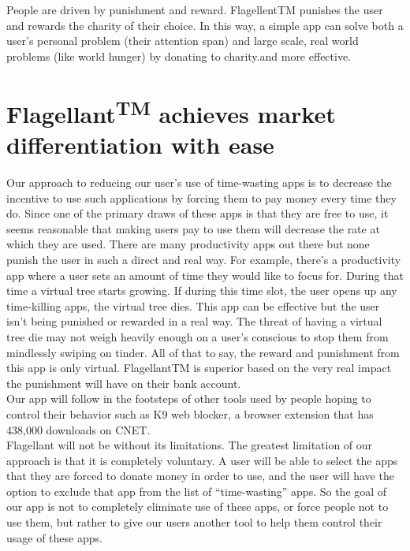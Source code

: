\documentclass[12pt]{article}
\begin{document}
People are driven by punishment and reward. FlagellentTM punishes the user and rewards the charity of their choice. In this way, a simple app can solve both a user’s personal problem (their attention span) and large scale, real world problems (like world hunger) by donating to charity.and more effective. \\

\section{ Flagellant\textsuperscript{TM} achieves market differentiation with ease}
Our approach to reducing our user’s use of time-wasting apps is to decrease the incentive to use such applications by forcing them to pay money every time they do. Since one of the primary draws of these apps is that they are free to use, it seems reasonable that making users pay to use them will decrease the rate at which they are used.
There are many productivity apps out there but none punish the user in such a direct and real way. For example, there’s a productivity app where a user sets an amount of time they would like to focus for. During that time a virtual tree starts growing. If during this time slot, the user opens up any time-killing apps, the virtual tree dies. This app can be effective but the user isn’t being punished or rewarded in a real way. The threat of having a virtual tree die may not weigh heavily enough on a user’s conscious to stop them from mindlessly swiping on tinder. All of that to say, the reward and punishment from this app is only virtual. FlagellantTM is superior based on the very real impact the punishment will have on their bank account. \\


Our app will follow in the footsteps of other tools used by people hoping to control their behavior such as K9 web blocker, a browser extension that has 438,000 downloads on CNET. \\

Flagellant will not be without its limitations. The greatest limitation of our approach is that it is completely voluntary. A user will be able to select the apps that they are forced to donate money in order to use, and the user will have the option to exclude that app from the list of “time-wasting” apps. So the goal of our app is not to completely eliminate use of these apps, or force people not to use them, but rather to give our users another tool to help them control their usage of these apps. \\
\end{document}

